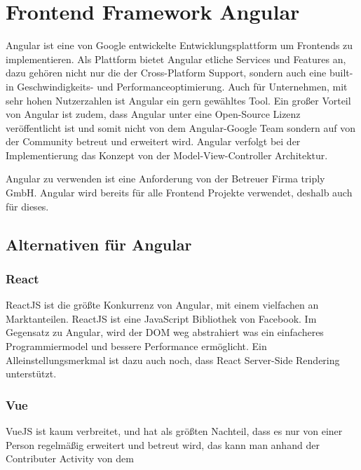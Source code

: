 \section{Frontend Framework Angular}
Angular ist eine von Google entwickelte Entwicklungsplattform um Frontends zu implementieren.
Als Plattform bietet Angular etliche Services und Features an, dazu gehören nicht nur die der Cross-Platform Support,
sondern auch eine built-in Geschwindigkeits- und Performanceoptimierung. Auch für Unternehmen, mit sehr hohen Nutzerzahlen
ist Angular ein gern gewähltes Tool. Ein großer Vorteil von Angular ist zudem, dass Angular unter eine Open-Source Lizenz veröffentlicht
ist und somit nicht von dem Angular-Google Team sondern auf von der Community betreut und erweitert wird.
Angular verfolgt bei der Implementierung das Konzept von der Model-View-Controller Architektur.

Angular zu verwenden ist eine Anforderung von der Betreuer Firma triply GmbH. Angular wird bereits für alle Frontend Projekte verwendet,
deshalb auch für dieses.

\subsection{Alternativen für Angular}

\subsubsection{React}
ReactJS ist die größte Konkurrenz von Angular, mit einem vielfachen an Marktanteilen.
ReactJS ist eine JavaScript Bibliothek von Facebook. Im Gegensatz zu Angular, wird der DOM weg abstrahiert was ein einfacheres 
Programmiermodel und bessere Performance ermöglicht. Ein Alleinstellungsmerkmal ist dazu auch noch, dass React Server-Side Rendering 
unterstützt.

\subsubsection{Vue}
VueJS ist kaum verbreitet, und hat als größten Nachteil, dass es nur von einer Person regelmäßig erweitert und betreut wird, das kann man anhand der Contributer Activity von dem 


